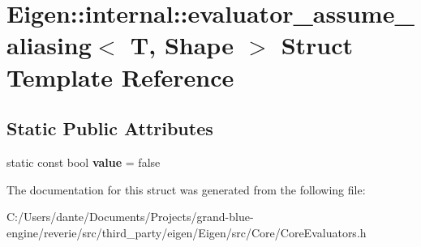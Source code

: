\hypertarget{struct_eigen_1_1internal_1_1evaluator__assume__aliasing}{}\section{Eigen\+::internal\+::evaluator\+\_\+assume\+\_\+aliasing$<$ T, Shape $>$ Struct Template Reference}
\label{struct_eigen_1_1internal_1_1evaluator__assume__aliasing}
\subsection*{Static Public Attributes}
\begin{DoxyCompactItemize}
\item 
\mbox{\label{struct_eigen_1_1internal_1_1evaluator__assume__aliasing_a960ca654a776d32872a1ecdf851467f8}} 
static const bool {\bfseries value} = false
\end{DoxyCompactItemize}


The documentation for this struct was generated from the following file\+:\begin{DoxyCompactItemize}
\item 
C\+:/\+Users/dante/\+Documents/\+Projects/grand-\/blue-\/engine/reverie/src/third\+\_\+party/eigen/\+Eigen/src/\+Core/Core\+Evaluators.\+h\end{DoxyCompactItemize}
